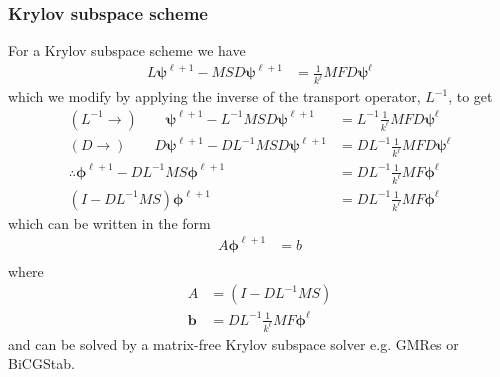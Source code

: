 \documentclass[11pt,letterpaper,notitlepage]{article}
\newcommand{\beqn}{\begin{equation}
		\begin{aligned}}
\newcommand{\eeqn}{\end{aligned}
\end{equation}}
\numberwithin{equation}{section}
\newcommand{\Linv}{L^{-1}}
\newcommand{\bphi}{\boldsymbol{\phi}}
\newcommand{\bpsi}{\boldsymbol{\psi}}
\begin{document}
\subsubsection{Krylov subspace scheme}
For a Krylov subspace scheme we have
\beqn 
L\bpsi^{\ell+1} - MSD\bpsi^{\ell+1} &=  \frac{1}{k^\ell} MFD\bpsi^{\ell}
\eeqn 
which we modify by applying the inverse of the transport operator, $\Linv$, to get
\beqn 
(\Linv \to) \quad \quad 
\bpsi^{\ell+1} - \Linv MSD\bpsi^{\ell+1} &=  \Linv \frac{1}{k^\ell} MFD\bpsi^{\ell} \\
(D \to) \quad \quad 
D\bpsi^{\ell+1} - D\Linv MSD\bpsi^{\ell+1} &=  D\Linv \frac{1}{k^\ell} MFD\bpsi^{\ell}\\
\therefore
\bphi^{\ell+1} - D\Linv MS\bphi^{\ell+1} &=  D\Linv \frac{1}{k^\ell} MF\bphi^{\ell}\\
(I - D\Linv MS) \bphi^{\ell+1} &= D\Linv \frac{1}{k^\ell} MF\bphi^{\ell}
\eeqn 
which can be written in the form
\beqn 
A \bphi^{\ell+1} &= b \\
\eeqn 
where
\beqn
A & = (I - D\Linv MS) \\
\mathbf{b} &= D\Linv \frac{1}{k^\ell} MF\bphi^{\ell}
\eeqn 
and can be solved by a matrix-free Krylov subspace solver e.g. GMRes or BiCGStab.
\end{document}
